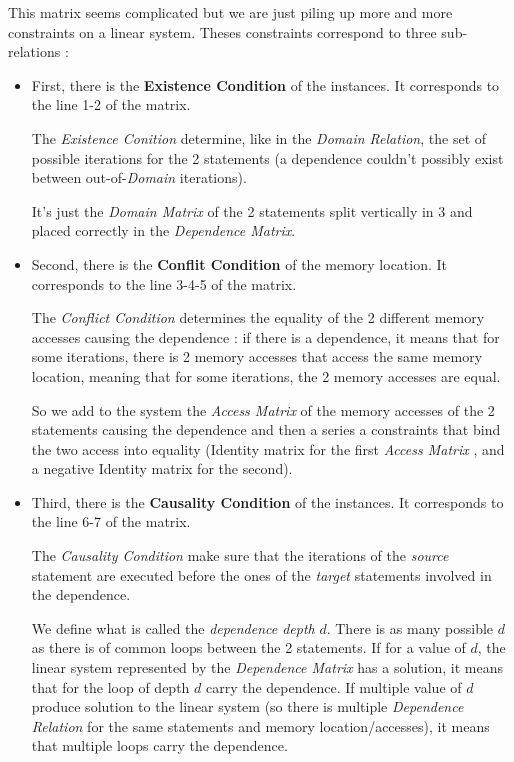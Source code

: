 \documentclass[paper=a4, fontsize=11.5pt]{scrartcl}
\numberwithin{equation}{section}        %
\numberwithin{figure}{section}          %
\numberwithin{table}{section}               %
\begin{document}
        This matrix seems complicated but we are just piling up more and more constraints
        on a linear system. Theses constraints correspond to three sub-relations :
        \begin{itemize}
            \item First, there is the \textbf{Existence Condition} of the instances.
                It corresponds to the line 1-2 of the matrix.

                The \textit{Existence Conition} determine, like in the \textit{Domain Relation},
                the set of possible iterations for the 2 statements (a dependence couldn't
                possibly exist between out-of-\textit{Domain} iterations).

                It's just the \textit{Domain Matrix} of the 2 statements split vertically
                in 3 and placed correctly in the \textit{Dependence Matrix}.
            \item Second, there is the \textbf{Conflit Condition} of the memory location.
                It corresponds to the line 3-4-5 of the matrix.

                The \textit{Conflict Condition} determines the equality of the 2 different 
                memory accesses causing the dependence : if there is a dependence,
                it means that for some iterations, there is 2 memory accesses that 
                access the same memory location, meaning that for some iterations,
                the 2 memory accesses are equal.

                So we add to the system the \textit{Access Matrix} of the memory accesses of the 2
                statements causing the dependence and then a series a constraints
                that bind the two access into equality (Identity matrix for the first
                \textit{Access Matrix} , and a negative Identity matrix for the second).
            \item Third, there is the \textbf{Causality Condition} of the instances.
                It corresponds to the line 6-7 of the matrix.

                The \textit{Causality Condition} make sure that the iterations of the
                \textit{source} statement are executed before the ones of the \textit{target} statements
                involved in the dependence.

                We define what is called the \textit{dependence depth} $d$. There is
                as many possible $d$ as there is of common loops between the 2 statements.
                If for a value of $d$, the linear system represented by the \textit{Dependence Matrix}
                has a solution, it means that for the loop of depth $d$ carry the dependence.
                If multiple value of $d$ produce solution to the linear system (so there
                is multiple \textit{Dependence Relation} for the same statements and
                memory location/accesses), it means that multiple loops carry the dependence.


\end{itemize}
\end{document}
